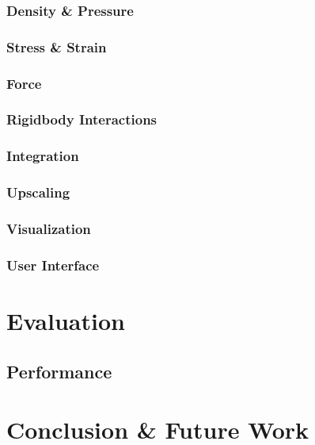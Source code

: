 \documentclass[intern]{cgMA}
\begin{document}
    \subsubsection{Density \& Pressure}
    \blindtext[1]
    \subsubsection{Stress \& Strain}
    \blindtext[1]
    \subsubsection{Force}
    \blindtext[1]
    \subsubsection{Rigidbody Interactions}
    \blindtext[1]
    \subsubsection{Integration}
    \blindtext[1]
    \subsubsection{Upscaling}
    \blindtext[1]
    \subsubsection{Visualization}
    \blindtext[1]
    \subsubsection{User Interface}
    \blindtext[1]
    \section{Evaluation}
    \blindtext[1]
    \subsection{Performance}
    \blindtext[1]
    \section{Conclusion \& Future Work}
    \blindtext[1]
    \newpage
    \printbibliography
\end{document}
